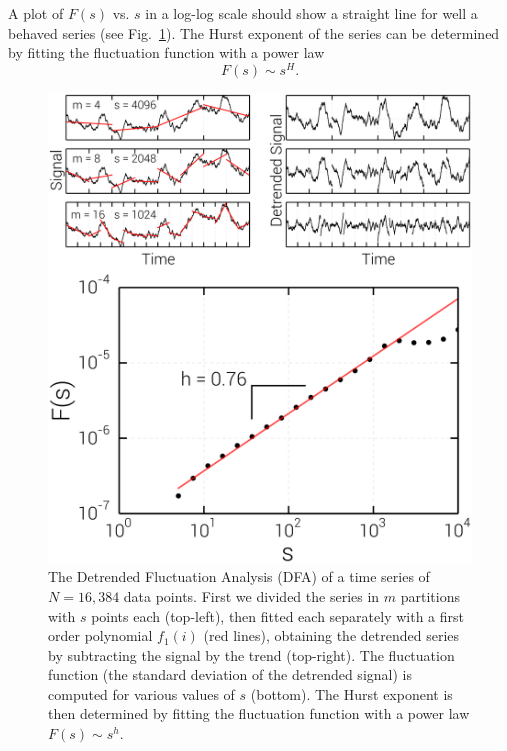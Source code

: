 A plot of $F(s)$ vs. $s$ in a log-log scale should show a straight line for
well a behaved series (see Fig.~\ref{fig:dfa}). The Hurst exponent of the
series can be determined by fitting the fluctuation function with a power law
\begin{equation}
    F(s)\sim s^H.
\end{equation}

\begin{figure}[t]
    \begin{center}
        \includegraphics[scale=0.25]{chapters/ch6-asle/figs/dfa}
    \end{center}
    \caption{The Detrended Fluctuation Analysis (DFA) of a time series of
        $N=16,384$ data points. First we divided the series in $m$ partitions with
        $s$ points each (top-left), then fitted each separately with a first order
        polynomial $f_1(i)$ (red lines), obtaining the detrended series by subtracting
        the signal by the trend (top-right).  The fluctuation function (the standard
        deviation of the detrended signal) is computed for various values of $s$
        (bottom).  The Hurst exponent is then determined by fitting the fluctuation
        function with a power law $F(s)\sim s^h$.}
\label{fig:dfa}
\end{figure}

